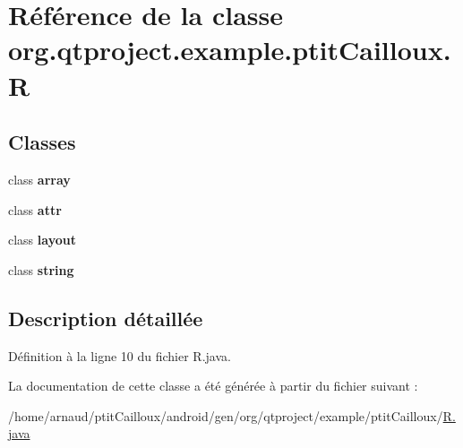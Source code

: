 \hypertarget{classorg_1_1qtproject_1_1example_1_1ptit_cailloux_1_1_r}{\section{Référence de la classe org.\-qtproject.\-example.\-ptit\-Cailloux.\-R}
\label{classorg_1_1qtproject_1_1example_1_1ptit_cailloux_1_1_r}
}
\subsection*{Classes}
\begin{DoxyCompactItemize}
\item 
class {\bfseries array}
\item 
class {\bfseries attr}
\item 
class {\bfseries layout}
\item 
class {\bfseries string}
\end{DoxyCompactItemize}


\subsection{Description détaillée}


Définition à la ligne 10 du fichier R.\-java.



La documentation de cette classe a été générée à partir du fichier suivant \-:\begin{DoxyCompactItemize}
\item 
/home/arnaud/ptit\-Cailloux/android/gen/org/qtproject/example/ptit\-Cailloux/\hyperlink{_r_8java}{R.\-java}\end{DoxyCompactItemize}
